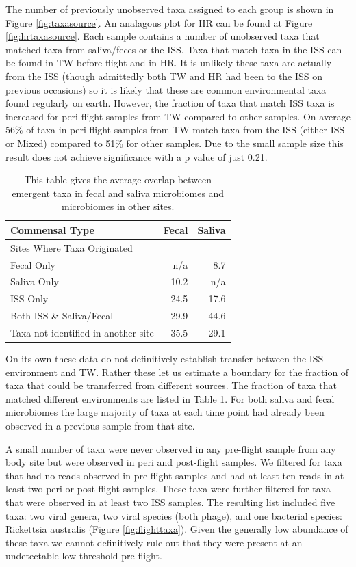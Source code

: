 The number of previously unobserved taxa assigned to each group is shown in Figure \ref{fig:taxasource}. An analagous plot for HR can be found at Figure \ref{fig:hrtaxasource}. Each sample contains a number of unobserved taxa that matched taxa from saliva/feces or the ISS. Taxa that match taxa in the ISS can be found in TW before flight and in HR. It is unlikely these taxa are actually from the ISS (though admittedly both TW and HR had been to the ISS on previous occasions) so it is likely that these are common environmental taxa found regularly on earth. However, the fraction of taxa that match ISS taxa is increased for peri-flight samples from TW compared to other samples. On average 56\% of taxa in peri-flight samples from TW match taxa from the ISS (either ISS or Mixed) compared to 51\% for other samples. Due to the small sample size this result does not achieve significance with a p value of just 0.21. 

\begin{table}[]
\centering
\caption{This table gives the average overlap between emergent taxa in fecal and saliva microbiomes and microbiomes in other sites.}
\label{tbl:sourcepercents}
\begin{tabular}{lrr}
\toprule
Commensal Type &      Fecal &     Saliva \\
\midrule
Sites Where Taxa Originated     &            &            \\
Fecal Only       &  n/a &   8.7  \\
Saliva Only      &  10.2 &  n/a  \\
ISS Only        &  24.5 &  17.6 \\
Both ISS \& Saliva/Fecal        &  29.9 &  44.6 \\
Taxa not identified in another site &  35.5 &  29.1 \\
\bottomrule
\end{tabular}
\end{table}

On its own these data do not definitively establish transfer between the ISS environment and TW. Rather these let us estimate a boundary for the fraction of taxa that could be transferred from different sources. The fraction of taxa that matched different environments are listed in Table \ref{tbl:sourcepercents}. For both saliva and fecal microbiomes the large majority of taxa at each time point had already been observed in a previous sample from that site.  

A small number of taxa were never observed in any pre-flight sample from any body site but were observed in peri and post-flight samples. We filtered for taxa that had no reads observed in pre-flight samples and had at least ten reads in at least two peri or post-flight samples. These taxa were further filtered for taxa that were observed in at least two ISS samples. The resulting list included five taxa: two viral genera, two viral species (both phage), and one bacterial species: Rickettsia australis (Figure \ref{fig:flighttaxa}). Given the generally low abundance of these taxa we cannot definitively rule out that they were present at an undetectable low threshold pre-flight.


